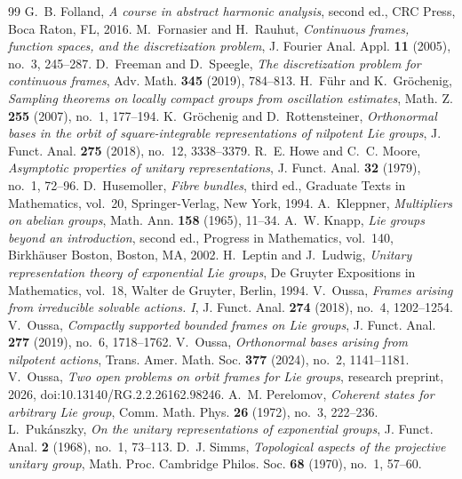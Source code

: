 \documentclass[10pt,a4paper]{amsart}
\numberwithin{equation}{section}
\begin{document}
\begin{thebibliography}{99}
 G.~B. Folland, \emph{A course in abstract harmonic analysis}, second ed., CRC Press, Boca Raton, FL, 2016.
 M.~Fornasier and H.~Rauhut, \emph{Continuous frames, function spaces, and the discretization problem}, J. Fourier Anal. Appl. \textbf{11} (2005), no.~3, 245--287.
 D.~Freeman and D.~Speegle, \emph{The discretization problem for continuous frames}, Adv. Math. \textbf{345} (2019), 784--813.
 H.~F\"uhr and K.~Gr\"ochenig, \emph{Sampling theorems on locally compact groups from oscillation estimates}, Math. Z. \textbf{255} (2007), no.~1, 177--194.
 K.~Gr\"ochenig and D.~Rottensteiner, \emph{Orthonormal bases in the orbit of square-integrable representations of nilpotent Lie groups}, J. Funct. Anal. \textbf{275} (2018), no.~12, 3338--3379.
 R.~E. Howe and C.~C. Moore, \emph{Asymptotic properties of unitary representations}, J. Funct. Anal. \textbf{32} (1979), no.~1, 72--96.
 D.~Husemoller, \emph{Fibre bundles}, third ed., Graduate Texts in Mathematics, vol.~20, Springer-Verlag, New York, 1994.
 A.~Kleppner, \emph{Multipliers on abelian groups}, Math. Ann. \textbf{158} (1965), 11--34.
 A.~W. Knapp, \emph{Lie groups beyond an introduction}, second ed., Progress in Mathematics, vol.~140, Birkh\"auser Boston, Boston, MA, 2002.
 H.~Leptin and J.~Ludwig, \emph{Unitary representation theory of exponential Lie groups}, De Gruyter Expositions in Mathematics, vol.~18, Walter de Gruyter, Berlin, 1994.
 V.~Oussa, \emph{Frames arising from irreducible solvable actions. I}, J. Funct. Anal. \textbf{274} (2018), no.~4, 1202--1254.
 V.~Oussa, \emph{Compactly supported bounded frames on Lie groups}, J. Funct. Anal. \textbf{277} (2019), no.~6, 1718--1762.
 V.~Oussa, \emph{Orthonormal bases arising from nilpotent actions}, Trans. Amer. Math. Soc. \textbf{377} (2024), no.~2, 1141--1181.
 V.~Oussa, \emph{Two open problems on orbit frames for Lie groups}, research preprint, 2026, doi:10.13140/RG.2.2.26162.98246.
 A.~M. Perelomov, \emph{Coherent states for arbitrary Lie group}, Comm. Math. Phys. \textbf{26} (1972), no.~3, 222--236.
 L.~Puk\'anszky, \emph{On the unitary representations of exponential groups}, J. Funct. Anal. \textbf{2} (1968), no.~1, 73--113.
 D.~J. Simms, \emph{Topological aspects of the projective unitary group}, Math. Proc. Cambridge Philos. Soc. \textbf{68} (1970), no.~1, 57--60.
\end{thebibliography}
\end{document}
